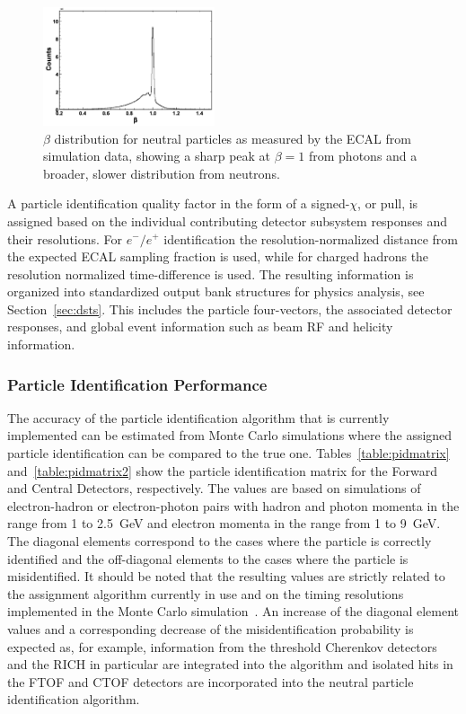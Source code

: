 \begin{figure}
\centering
\includegraphics[width=0.45\textwidth]{pics/neutral_beta.png}
\caption{$\beta$ distribution for neutral particles as measured by the ECAL from simulation data, showing a sharp
  peak at $\beta=1$ from photons and a broader, slower distribution from neutrons.}
\label{fig:neutbeta}
\end{figure}

A particle identification quality factor in the form of a {\color{red}signed-$\chi$, or pull,} is assigned based on the individual
contributing detector subsystem responses and their resolutions. For $e^-/e^+$ identification the
resolution-normalized distance from the expected ECAL sampling fraction is used, while for charged hadrons the
resolution normalized time-difference is used. The resulting information is organized into standardized output
bank structures for physics analysis, see Section~\ref{sec:dsts}. This includes the particle four-vectors, the
associated detector responses, and global event information such as beam RF and helicity information.

\subsubsection{Particle Identification Performance}

The accuracy of the particle identification algorithm that is currently implemented can be estimated from
Monte Carlo simulations where the assigned particle identification can be compared to the true one.
Tables~\ref{table:pidmatrix} and~\ref{table:pidmatrix2} show the particle identification matrix for the Forward
and Central Detectors, respectively. The values are based on simulations of electron-hadron or electron-photon
pairs with hadron and photon momenta in the range from 1 to 2.5~GeV and electron momenta in the range from 1 to
9~GeV. The diagonal elements correspond to the cases where the particle is correctly identified and the off-diagonal
elements to the cases where the particle is misidentified. It should be noted that the resulting values are strictly
related to the assignment algorithm currently in use and on the timing resolutions implemented in the Monte Carlo
simulation~\cite{sim-nim}. An increase of the diagonal element values and a corresponding decrease of the
misidentification probability is expected as, for example, information from the threshold Cherenkov detectors and
the RICH in particular are integrated into the algorithm and isolated hits in the FTOF and CTOF detectors are
incorporated into the neutral particle identification algorithm.

